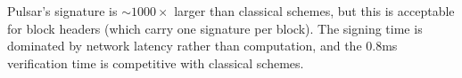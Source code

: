 Pulsar's signature is $\sim 1000\times$ larger than classical schemes, but this is
acceptable for block headers (which carry one signature per block). The signing time
is dominated by network latency rather than computation, and the 0.8ms verification
time is competitive with classical schemes.

